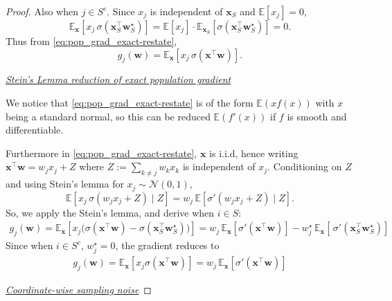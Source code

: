 \documentclass{article}
\theoremstyle{plain}
\theoremstyle{definition}
\theoremstyle{remark}
\begin{document}
{\begin{proof}
Also when $j\in S^c$.
Since $x_j$ is independent of $\boldsymbol x_S$ and $\mathbb E[x_j] = 0$,
\[
\mathbb E_{\boldsymbol x}\!\left[x_j\,\sigma(\boldsymbol x_S^\top \boldsymbol w_S^\star)\right]
=
\mathbb E[x_j]\cdot \mathbb E_{\boldsymbol x_S}\!\left[\sigma(\boldsymbol x_S^\top \boldsymbol w_S^\star)\right]
=0.
\]
Thus from \eqref{eq:pop_grad_exact-restate},
\[
g_j(\boldsymbol w)=\mathbb E_{\boldsymbol x}\!\left[x_j\,\sigma(\boldsymbol x^\top \boldsymbol w)\right].
\]

\underline{\textit{Stein's Lemma reduction of exact population gradient}}

We notice that \eqref{eq:pop_grad_exact-restate} is of the form $\mathbb{E}(xf(x))$ with $x$ being a standard normal, so this can be reduced $\mathbb{E}(f'(x))$ if $f$ is smooth and differentiable. 

Furthermore in \eqref{eq:pop_grad_exact-restate}, $\mathbf{x}$ is i.i.d, hence writing $\boldsymbol x^\top \boldsymbol w = w_j x_j + Z$ where
$Z:=\sum_{k\neq j} w_k x_k$ is independent of $x_j$.
Conditioning on $Z$ and using Stein's lemma for $x_j\sim\mathcal N(0,1)$,
\[
\mathbb E\!\left[x_j\,\sigma(w_j x_j+Z)\mid Z\right]
=
w_j\,\mathbb E\!\left[\sigma'(w_j x_j+Z)\mid Z\right].
\]
So, we apply the Stein's lemma, and derive when $i\in S$:
\begin{align}
  g_j(\boldsymbol w)=  \mathbb E_{\boldsymbol x}\!\left[
x_j\Big(\sigma(\boldsymbol x^\top \boldsymbol w)-\sigma(\boldsymbol x_S^\top \boldsymbol w_S^\star)\Big)\right] = w_j\,\mathbb E_{\boldsymbol x}\!\left[\sigma'(\boldsymbol x^\top \boldsymbol w)\right] - w^{\star}_j\,\mathbb E_{\boldsymbol x}\!\left[\,\sigma'(\boldsymbol x_S^\top \boldsymbol w_S^\star)\right]
\end{align}
Since when $i \in S^{c}$, $w^{\star}_j = 0$, the gradient reduces to 
\begin{align}
  g_j(\boldsymbol w) =   \mathbb E_{\boldsymbol x}\!\left[
x_j\sigma(\boldsymbol x^\top \boldsymbol w)\right] = w_j\,\mathbb E_{\boldsymbol x}\!\left[\sigma'(\boldsymbol x^\top \boldsymbol w)\right] 
\end{align}

\underline{\textit{Coordinate-wise sampling noise}}






\end{proof}}
\end{document}
